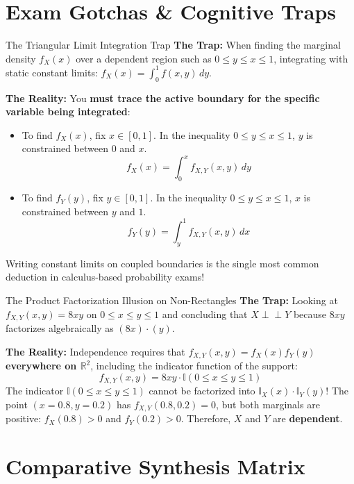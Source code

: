 \section{Exam Gotchas \& Cognitive Traps}

\begin{trapbox}{The Triangular Limit Integration Trap}
\textbf{The Trap:} When finding the marginal density $f_X(x)$ over a dependent region such as $0 \le y \le x \le 1$, integrating with static constant limits: $f_X(x) = \int_0^1 f(x, y) \, dy$.

\textbf{The Reality:} You \textbf{must trace the active boundary for the specific variable being integrated}:
\begin{itemize}
    \item To find $f_X(x)$, fix $x \in [0, 1]$. In the inequality $0 \le y \le x \le 1$, $y$ is constrained between $0$ and $x$.
    $$f_X(x) = \int_0^x f_{X,Y}(x, y) \, dy$$
    \item To find $f_Y(y)$, fix $y \in [0, 1]$. In the inequality $0 \le y \le x \le 1$, $x$ is constrained between $y$ and $1$.
    $$f_Y(y) = \int_y^1 f_{X,Y}(x, y) \, dx$$
\end{itemize}
Writing constant limits on coupled boundaries is the single most common deduction in calculus-based probability exams!
\end{trapbox}

\begin{trapbox}{The Product Factorization Illusion on Non-Rectangles}
\textbf{The Trap:} Looking at $f_{X,Y}(x, y) = 8xy$ on $0 \le x \le y \le 1$ and concluding that $X \perp\!\!\!\perp Y$ because $8xy$ factorizes algebraically as $(8x) \cdot (y)$.

\textbf{The Reality:} Independence requires that $f_{X,Y}(x, y) = f_X(x) f_Y(y)$ \textbf{everywhere on $\mathbb{R}^2$}, including the indicator function of the support:
$$f_{X,Y}(x, y) = 8xy \cdot \mathbb{I}(0 \le x \le y \le 1)$$
The indicator $\mathbb{I}(0 \le x \le y \le 1)$ cannot be factorized into $\mathbb{I}_X(x) \cdot \mathbb{I}_Y(y)$! The point $(x=0.8, y=0.2)$ has $f_{X,Y}(0.8, 0.2) = 0$, but both marginals are positive: $f_X(0.8) > 0$ and $f_Y(0.2) > 0$. Therefore, $X$ and $Y$ are \textbf{dependent}.
\end{trapbox}

\section{Comparative Synthesis Matrix}


